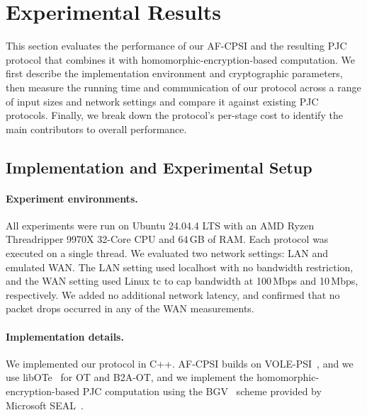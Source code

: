 \section{Experimental Results}
\label{sec:experimental-results}
This section evaluates the performance of our AF-CPSI and the resulting
PJC protocol that combines it with homomorphic-encryption-based
computation. We first describe the implementation environment and
cryptographic parameters, then measure the running time and communication
of our protocol across a range of input sizes and network settings and
compare it against existing PJC protocols. Finally, we break down the
protocol's per-stage cost to identify the main contributors to overall
performance.



\subsection{Implementation and Experimental Setup}
\label{sec:experimental-setup}

\paragraph{Experiment environments.}
All experiments were run on Ubuntu 24.04.4 LTS with an AMD Ryzen
Threadripper 9970X 32-Core CPU and 64\,GB of RAM. Each protocol was
executed on a single thread. We evaluated two network settings: LAN and
emulated WAN. The LAN setting used localhost with no bandwidth
restriction, and the WAN setting used Linux \textsf{tc} to cap bandwidth
at 100\,Mbps and 10\,Mbps, respectively. We added no additional network
latency, and confirmed that no packet drops occurred in any of the WAN
measurements.

\medskip
\paragraph{Implementation details.}
We implemented our protocol in C++. AF-CPSI builds on \textsf{VOLE-PSI}~\cite{volepsi},
and we use \textsf{libOTe}~\cite{libOTe} for OT and B2A-OT, and we implement the homomorphic-encryption-based PJC
computation using the BGV~\cite{BGV14} scheme provided by Microsoft SEAL~\cite{SEAL}.

\medskip

